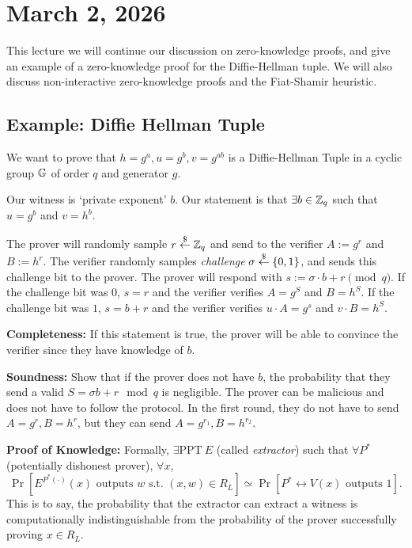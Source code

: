 \section{March 2, 2026}
\label{20260302}

This lecture we will continue our discussion on zero-knowledge proofs, and give an example of a zero-knowledge proof for the Diffie-Hellman tuple. We will also discuss non-interactive zero-knowledge proofs and the Fiat-Shamir heuristic.

\subsection{Example: Diffie Hellman Tuple}

We want to prove that $h = g^a, u = g^b, v = g^{ab}$ is a Diffie-Hellman Tuple in a cyclic group $\mathbb G$ of order $q$ and generator $g$.

Our witness is `private exponent' $b$. Our statement is that $\exists b\in \mathbb Z_q$ such that $u = g^b$ and $v = h^b$.


The prover will randomly sample $r\overset{\$}{\leftarrow} \mathbb Z_q$ and send to the verifier $A:=g^r$ and $B:=h^r$. The verifier randomly samples \emph{challenge} $\sigma \overset{\$}{\leftarrow} \{0, 1\}$, and sends this challenge bit to the prover. The prover will respond with $s := \sigma\cdot b + r\pmod{q}$. If the challenge bit was $0$, $s = r$ and the verifier verifies $A = g^S$ and $B = h^S$. If the challenge bit was $1$, $s = b + r$ and the verifier verifies $u\cdot A = g^s$ and $v\cdot B = h^S$.

\textbf{Completeness:} If this statement is true, the prover will be able to convince the verifier since they have knowledge of $b$.

\textbf{Soundness:} Show that if the prover does not have $b$, the probability that they send a valid $S = \sigma b + r \mod q$ is negligible. The prover can be malicious and does not have to follow the protocol. In the first round, they do not have to send $A = g^r, B = h^r$, but they can send $A = g^{r_1}, B= h^{r_2}$.

\textbf{Proof of Knowledge:} Formally, $\exists \mathrm{PPT}\ E$ (called \emph{extractor}) such that $\forall P^*$ (potentially dishonest prover), $\forall x$,
\[\Pr[E^{P^*(\cdot)}(x) \text{ outputs }w\text{ s.t. }(x, w)\in R_L] \simeq \Pr[P^*\leftrightarrow V(x)\text{ outputs }1].\]
This is to say, the probability that the extractor can extract a witness is computationally indistinguishable from the probability of the prover successfully proving $x\in R_L$.

